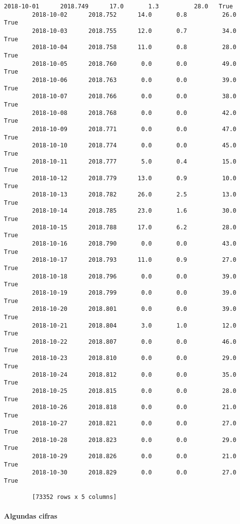 \documentclass[11pt]{article}
\begin{document}
\begin{Verbatim}[commandchars=\\\{\}]
        2018-10-01      2018.749      17.0       1.3          28.0   True
        2018-10-02      2018.752      14.0       0.8          26.0   True
        2018-10-03      2018.755      12.0       0.7          34.0   True
        2018-10-04      2018.758      11.0       0.8          28.0   True
        2018-10-05      2018.760       0.0       0.0          49.0   True
        2018-10-06      2018.763       0.0       0.0          39.0   True
        2018-10-07      2018.766       0.0       0.0          38.0   True
        2018-10-08      2018.768       0.0       0.0          42.0   True
        2018-10-09      2018.771       0.0       0.0          47.0   True
        2018-10-10      2018.774       0.0       0.0          45.0   True
        2018-10-11      2018.777       5.0       0.4          15.0   True
        2018-10-12      2018.779      13.0       0.9          10.0   True
        2018-10-13      2018.782      26.0       2.5          13.0   True
        2018-10-14      2018.785      23.0       1.6          30.0   True
        2018-10-15      2018.788      17.0       6.2          28.0   True
        2018-10-16      2018.790       0.0       0.0          43.0   True
        2018-10-17      2018.793      11.0       0.9          27.0   True
        2018-10-18      2018.796       0.0       0.0          39.0   True
        2018-10-19      2018.799       0.0       0.0          39.0   True
        2018-10-20      2018.801       0.0       0.0          39.0   True
        2018-10-21      2018.804       3.0       1.0          12.0   True
        2018-10-22      2018.807       0.0       0.0          46.0   True
        2018-10-23      2018.810       0.0       0.0          29.0   True
        2018-10-24      2018.812       0.0       0.0          35.0   True
        2018-10-25      2018.815       0.0       0.0          28.0   True
        2018-10-26      2018.818       0.0       0.0          21.0   True
        2018-10-27      2018.821       0.0       0.0          27.0   True
        2018-10-28      2018.823       0.0       0.0          29.0   True
        2018-10-29      2018.826       0.0       0.0          21.0   True
        2018-10-30      2018.829       0.0       0.0          27.0   True
        
        [73352 rows x 5 columns]
\end{Verbatim}
            
    \hypertarget{algundas-cifras}{%
\paragraph{Algundas cifras}\label{algundas-cifras}}
\end{document}
